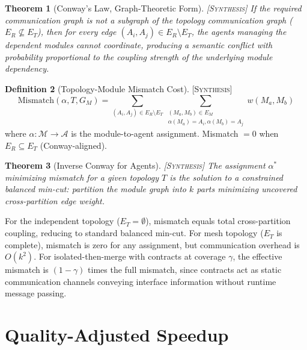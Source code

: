 \documentclass[11pt]{article}
\newtheorem{theorem}{Theorem}[section]
\theoremstyle{definition}
\newtheorem{definition}[theorem]{Definition}
\theoremstyle{remark}
\newcommand{\synthesis}{\textsc{[Synthesis]}}
\begin{document}
\begin{theorem}[Conway's Law, Graph-Theoretic Form] \synthesis{}
\label{thm:conway}
If the required communication graph is not a subgraph of the topology communication graph ($E_R \not\subseteq E_T$), then for every edge $(A_i, A_j) \in E_R \setminus E_T$, the agents managing the dependent modules cannot coordinate, producing a semantic conflict with probability proportional to the coupling strength of the underlying module dependency.
\end{theorem}

\begin{definition}[Topology-Module Mismatch Cost] \synthesis{}
\begin{equation}
  \mathrm{Mismatch}(\alpha, T, G_M) = \sum_{(A_i, A_j) \in E_R \setminus E_T} \sum_{\substack{(M_a, M_b) \in E_M \\ \alpha(M_a)=A_i, \alpha(M_b)=A_j}} w(M_a, M_b)
\end{equation}
where $\alpha: \mathcal{M} \to \mathcal{A}$ is the module-to-agent assignment.
Mismatch $= 0$ when $E_R \subseteq E_T$ (Conway-aligned).
\end{definition}

\begin{theorem}[Inverse Conway for Agents] \synthesis{}
\label{thm:inverse-conway}
The assignment $\alpha^*$ minimizing mismatch for a given topology $T$ is the solution to a constrained balanced min-cut: partition the module graph into $k$ parts minimizing uncovered cross-partition edge weight.
\end{theorem}

For the independent topology ($E_T = \emptyset$), mismatch equals total cross-partition coupling, reducing to standard balanced min-cut.
For mesh topology ($E_T$ is complete), mismatch is zero for any assignment, but communication overhead is $O(k^2)$.
For isolated-then-merge with contracts at coverage $\gamma$, the effective mismatch is $(1-\gamma)$ times the full mismatch, since contracts act as static communication channels conveying interface information without runtime message passing.


\section{Quality-Adjusted Speedup}
\label{sec:qas}
\end{document}
